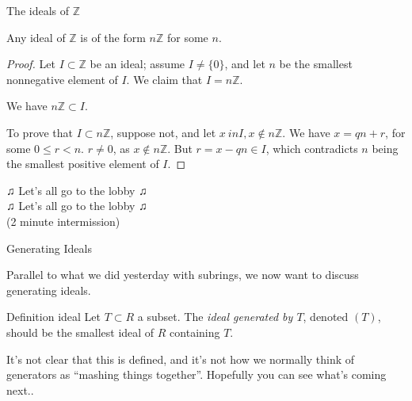 \documentclass{beamer}
\begin{document}
\begin{frame}{The ideals of $\mathbb{Z}$}

\begin{lemma} Any ideal of $\mathbb{Z}$ is of the form $n\mathbb{Z}$ for some $n$.
\end{lemma}

\begin{proof}
Let $I\subset \mathbb{Z}$ be an ideal; assume $I\neq \{0\}$, and let $n$ be the smallest nonnegative element of $I$.  We claim that $I=n\mathbb{Z}$.

We have $n\mathbb{Z}\subset I$.  

To prove that $I\subset n\mathbb{Z}$, suppose not, and let $x\ in I, x\notin n\mathbb{Z}$.  We have $x=qn+r$, for some $0\leq r<n$.  $r\neq 0$, as $x\notin n\mathbb{Z}$.  But $r=x-qn\in I$, which contradicts $n$ being the smallest positive element of $I$.

\end{proof}
\end{frame}



\begin{frame}[plain,c]

\begin{center}

\Huge

$\twonotes$ Let's all go to the lobby $\twonotes$ \\ $\twonotes$ Let's all go to the lobby $\twonotes$ \\
(2 minute intermission)
\end{center}

\end{frame}




\begin{frame}{Generating Ideals}

Parallel to what we did yesterday with subrings, we now want to discuss generating ideals.

\begin{block}{Definition ideal}
Let $T\subset R$ a subset.  The \emph{ideal generated by $T$}, denoted $(T)$, should be the smallest ideal of $R$ containing $T$.
\end{block}

It's not clear that this is defined, and it's not how we normally think of generators as ``mashing things together''.  Hopefully you can see what's coming next..


\end{frame}
\end{document}
